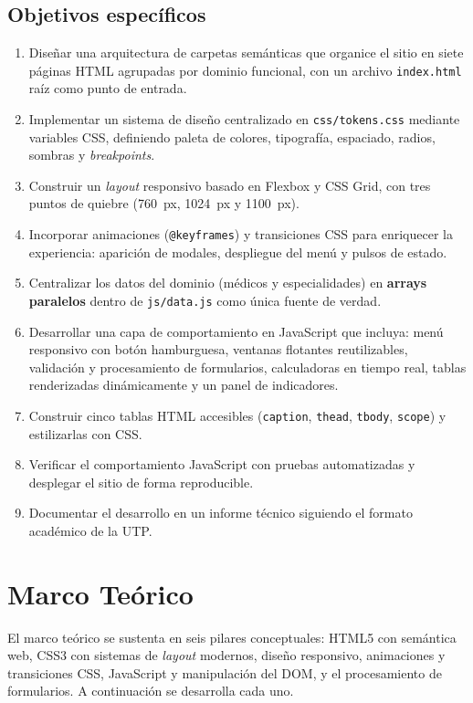 \documentclass[11pt,a4paper]{article}
\begin{document}
\subsection{Objetivos específicos}
\begin{enumerate}
  \item Diseñar una arquitectura de carpetas semánticas que organice el sitio en siete páginas HTML agrupadas por dominio funcional, con un archivo \texttt{index.html} raíz como punto de entrada.
  \item Implementar un sistema de diseño centralizado en \texttt{css/tokens.css} mediante variables CSS, definiendo paleta de colores, tipografía, espaciado, radios, sombras y \emph{breakpoints}.
  \item Construir un \emph{layout} responsivo basado en Flexbox y CSS Grid, con tres puntos de quiebre (760~px, 1024~px y 1100~px).
  \item Incorporar animaciones (\lstinline|@keyframes|) y transiciones CSS para enriquecer la experiencia: aparición de modales, despliegue del menú y pulsos de estado.
  \item Centralizar los datos del dominio (médicos y especialidades) en \textbf{arrays paralelos} dentro de \texttt{js/data.js} como única fuente de verdad.
  \item Desarrollar una capa de comportamiento en JavaScript que incluya: menú responsivo con botón hamburguesa, ventanas flotantes reutilizables, validación y procesamiento de formularios, calculadoras en tiempo real, tablas renderizadas dinámicamente y un panel de indicadores.
  \item Construir cinco tablas HTML accesibles (\lstinline|caption|, \lstinline|thead|, \lstinline|tbody|, \lstinline|scope|) y estilizarlas con CSS.
  \item Verificar el comportamiento JavaScript con pruebas automatizadas y desplegar el sitio de forma reproducible.
  \item Documentar el desarrollo en un informe técnico siguiendo el formato académico de la UTP.
\end{enumerate}

\section{Marco Teórico}

El marco teórico se sustenta en seis pilares conceptuales: HTML5 con semántica web, CSS3 con sistemas de \emph{layout} modernos, diseño responsivo, animaciones y transiciones CSS, JavaScript y manipulación del DOM, y el procesamiento de formularios. A continuación se desarrolla cada uno.
\end{document}
